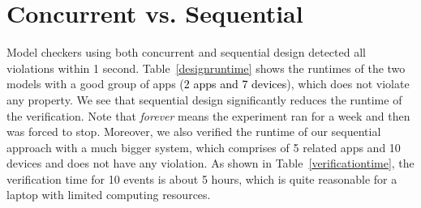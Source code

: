 \section{Concurrent vs. Sequential}
Model checkers using both concurrent and sequential design detected all violations
within 1 second. Table~\ref{designruntime} shows the runtimes of the two models with
a good group of apps (\textcolor{black}{2 apps and 7 devices}), which does not violate any property.
We see that sequential design significantly reduces the runtime of the verification.
Note that \textit{forever} means the experiment ran for a week and then was forced to stop.
Moreover, we also verified the runtime of our sequential approach with a much bigger system,
which comprises of 5 related apps and 10 devices and does not have any violation.
{\color{black}As shown in Table~\ref{verificationtime}}, the verification time for 10 events is about 5 hours,
which is quite reasonable for a laptop with limited computing resources.
